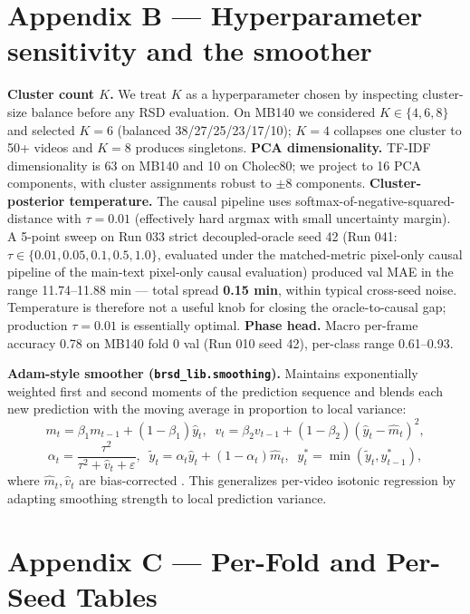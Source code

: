 \section{Appendix B --- Hyperparameter sensitivity and the smoother}\label{appendix-b-hyperparameter-sensitivity-and-the-smoother}

\textbf{Cluster count \(K\).} We treat \(K\) as a hyperparameter chosen
by inspecting cluster-size balance before any RSD evaluation. On MB140
we considered \(K \in \{4, 6, 8\}\) and selected \(K = 6\) (balanced
38/27/25/23/17/10); \(K = 4\) collapses one cluster to 50+ videos and
\(K = 8\) produces singletons. \textbf{PCA dimensionality.} TF-IDF
dimensionality is 63 on MB140 and 10 on Cholec80; we project to 16 PCA
components, with cluster assignments robust to \(\pm 8\) components.
\textbf{Cluster-posterior temperature.} The causal pipeline uses
softmax-of-negative-squared-distance with \(\tau =
0.01\) (effectively hard argmax with small uncertainty margin). A
5-point sweep on Run 033 strict decoupled-oracle seed 42 (Run 041:
\(\tau \in \{0.01, 0.05, 0.1, 0.5, 1.0\}\), evaluated under the
matched-metric pixel-only causal pipeline of the main-text pixel-only causal evaluation) produced val MAE in
the range 11.74--11.88 min --- total spread \textbf{0.15 min}, within
typical cross-seed noise. Temperature is therefore not a useful knob for
closing the oracle-to-causal gap; production \(\tau = 0.01\) is
essentially optimal. \textbf{Phase head.} Macro per-frame accuracy 0.78
on MB140 fold 0 val (Run 010 seed 42), per-class range 0.61--0.93.

\textbf{Adam-style smoother (\texttt{brsd\_lib.smoothing}).} Maintains
exponentially weighted first and second moments of the prediction
sequence and blends each new prediction with the moving average in
proportion to local variance: \[
m_t = \beta_1 m_{t-1} + (1{-}\beta_1) \hat y_t,\;\;
v_t = \beta_2 v_{t-1} + (1{-}\beta_2)(\hat y_t - \hat m_t)^2,
\] \[
\alpha_t = \frac{\tau^2}{\tau^2 + \hat v_t + \varepsilon},\;\;
\tilde y_t = \alpha_t \hat y_t + (1{-}\alpha_t)\hat m_t,\;\;
y^*_t = \min(\tilde y_t, y^*_{t-1}),
\] where \(\hat m_t, \hat v_t\) are bias-corrected \citep{kingma2015adam}.
This generalizes per-video isotonic regression by adapting smoothing
strength to local prediction variance.

\section{Appendix C --- Per-Fold and Per-Seed Tables}\label{appendix-c-per-fold-and-per-seed-tables}

